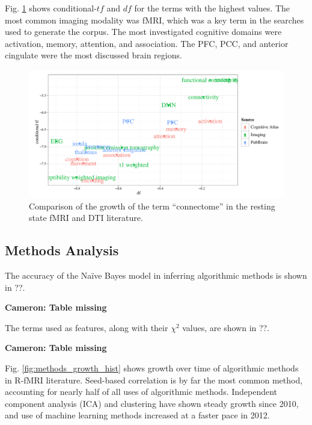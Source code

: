\documentclass[5p]{elsarticle}
\newcommand\MyCBox[1]{%
  \colorbox{yellow!60}{\begin{varwidth}{\dimexpr\linewidth-2\fboxsep}#1\end{varwidth}}}
\newcommand{\COMMENTCC}[1]{\MyCBox{\textcolor{cc_commentcolor}{\textbf{Cameron:
#1}}}}
\begin{document}
Fig. \ref{fig:tfidf_top2} shows conditional-$t\!f$ and $d\!f$ for the
terms with the highest values. The most common imaging modality was fMRI,
which was a key term in the searches used to generate the corpus. The most
investigated cognitive domains were activation, memory, attention, and
association. The PFC, PCC, and anterior cingulate were the most discussed
brain regions. 

\begin{figure}
  \begin{center}
    \includegraphics[width=\linewidth]{figures/tfidf_top2}%
    \caption{Comparison of the growth of the term ``connectome'' in the
    resting state fMRI and DTI literature.  
    \label{fig:tfidf_top2}
    }
  \end{center}
\end{figure}

\subsection{Methods Analysis}

The accuracy of the Na\"ive Bayes model in inferring
algorithmic methods is shown in ??. \COMMENTCC{Table missing}

The terms used as features, along with their $\chi^2$ values, are shown in
??. \COMMENTCC{Table missing}

Fig. \ref{fig:methods_growth_hist} shows growth over time of algorithmic
methods in R-fMRI literature.  Seed-based correlation is by far the most
common method, accounting for nearly half of all uses of algorithmic
methods. Independent component analysis (ICA) and clustering have shown
steady growth since 2010, and use of machine learning methods increased at
a faster pace in 2012.
\end{document}
